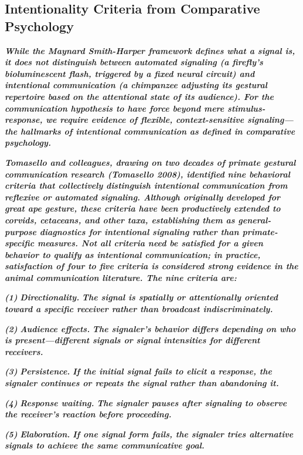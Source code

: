 \documentclass[11pt,letterpaper]{article}
\begin{document}
\subsection{Intentionality Criteria from Comparative Psychology}

\textbf{\textit{While the Maynard Smith-Harper framework defines what a signal is, it does not distinguish between automated signaling (a firefly's bioluminescent flash, triggered by a fixed neural circuit) and intentional communication (a chimpanzee adjusting its gestural repertoire based on the attentional state of its audience). For the communication hypothesis to have force beyond mere stimulus-response, we require evidence of flexible, context-sensitive signaling---the hallmarks of intentional communication as defined in comparative psychology.}}


\textbf{\textit{Tomasello and colleagues, drawing on two decades of primate gestural communication research (Tomasello 2008), identified nine behavioral criteria that collectively distinguish intentional communication from reflexive or automated signaling. Although originally developed for great ape gesture, these criteria have been productively extended to corvids, cetaceans, and other taxa, establishing them as general-purpose diagnostics for intentional signaling rather than primate-specific measures. Not all criteria need be satisfied for a given behavior to qualify as intentional communication; in practice, satisfaction of four to five criteria is considered strong evidence in the animal communication literature. The nine criteria are:}}


\textbf{\textit{(1) }}\textbf{\textit{Directionality. }}\textbf{\textit{The signal is spatially or attentionally oriented toward a specific receiver rather than broadcast indiscriminately.}}


\textbf{\textit{(2) }}\textbf{\textit{Audience effects. }}\textbf{\textit{The signaler's behavior differs depending on who is present---different signals or signal intensities for different receivers.}}


\textbf{\textit{(3) }}\textbf{\textit{Persistence. }}\textbf{\textit{If the initial signal fails to elicit a response, the signaler continues or repeats the signal rather than abandoning it.}}


\textbf{\textit{(4) }}\textbf{\textit{Response waiting. }}\textbf{\textit{The signaler pauses after signaling to observe the receiver's reaction before proceeding.}}


\textbf{\textit{(5) }}\textbf{\textit{Elaboration. }}\textbf{\textit{If one signal form fails, the signaler tries alternative signals to achieve the same communicative goal.}}
\end{document}
